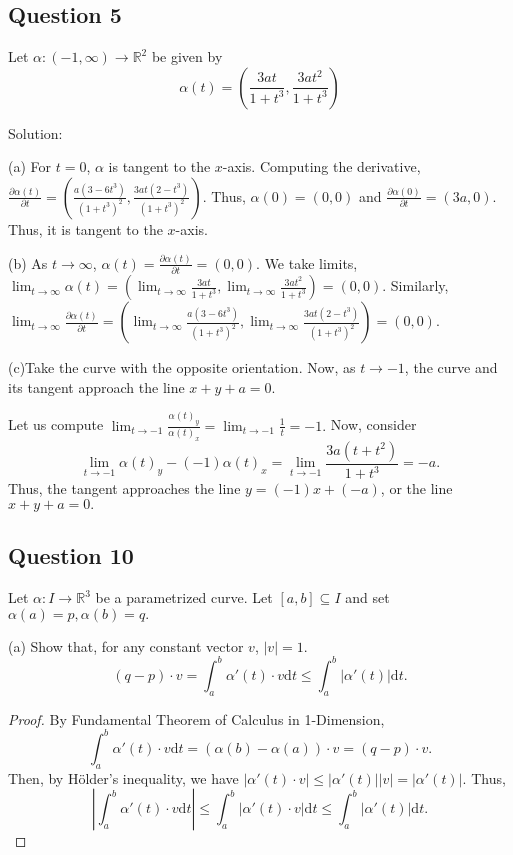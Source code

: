 \documentclass[12pt]{article}
\begin{document}
\subsection*{Question 5}

Let $\alpha : (-1, \infty) \to \mathbb{R}^2$ be given by
\begin{equation*}
     \alpha(t) = \left(\frac{3at}{1+t^3},\frac{3at^2}{1+t^3}\right)
\end{equation*}

Solution:

(a) For $t = 0$, $\alpha$ is tangent to the $x$-axis.
Computing the derivative, $\frac{\partial \alpha(t)}{\partial t} = \left(\frac{a(3 - 6t^3)}{(1+t^3)^2},\frac{3at(2-t^3)}{(1+t^3)^2}\right)$.
Thus, $\alpha(0) = (0,0)$ and $\frac{\partial \alpha(0)}{\partial t} = (3a, 0)$. Thus, it is tangent to the $x$-axis.

(b) As $t \to \infty$, $\alpha(t) = \frac{\partial \alpha(t)}{\partial t} = (0,0).$
We take limits, $\lim_{t\to \infty}\alpha(t) = \left(\lim_{t\to \infty}\frac{3at}{1+t^3},\lim_{t\to\infty}\frac{3at^2}{1+t^3}\right) = (0,0).$
Similarly, $\lim_{t \to \infty} \frac{\partial \alpha(t)}{\partial t} = 
\left(\lim_{t\to \infty}\frac{a(3 - 6t^3)}{(1+t^3)^2},\lim_{t\to \infty}\frac{3at(2-t^3)}{(1+t^3)^2}\right) = (0,0).$

(c)Take the curve with the opposite orientation. 
Now, as $t \to -1$, the curve
and its tangent approach the line $x + y + a = 0$.

Let us compute $\lim_{t\to -1}\frac {\alpha(t)_y}{\alpha(t)_x} = \lim_{t\to -1} \frac 1t = -1.$
Now, consider $$\lim_{t \to -1} \alpha(t)_y - (-1)\alpha(t)_x = \lim_{t\to -1} \frac{3a(t + t^2)}{1 + t^3} = -a.$$
Thus, the tangent approaches the line $y = (-1)x + (-a)$, or the line $x + y + a = 0.$

\subsection*{Question 10}

Let $\alpha: I \to \mathbb{R}^3$ be a parametrized curve.
Let $[a,b] \subseteq I$ and set $\alpha(a) = p, \alpha(b) = q.$

(a) Show that, for any constant vector $v$, $|v| = 1$.
     \begin{equation*}
          (q-p)\cdot v = \int_a^b \alpha'(t)\cdot v \mathrm{d}t \leq \int_a^b |\alpha'(t)| \mathrm dt.
     \end{equation*}

\begin{proof}
     By Fundamental Theorem of Calculus in 1-Dimension,
     $$\int_a^b \alpha'(t)\cdot v\mathrm dt = (\alpha(b) - \alpha(a))\cdot v = (q-p)\cdot v.$$
     Then, by H\"{o}lder's inequality, we have $|\alpha'(t)\cdot v| \leq |\alpha'(t)||v| = |\alpha'(t)|.$
     Thus, $$\left |\int_a^b \alpha'(t)\cdot v\mathrm dt\right | \leq \int_a^b |\alpha'(t)\cdot v| \mathrm dt \leq \int_a^b |\alpha'(t)| \mathrm dt.$$
\end{proof}
\end{document}
